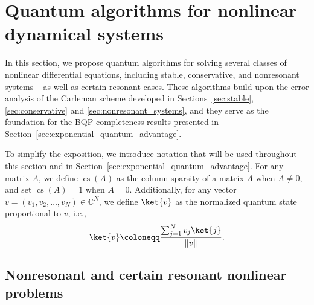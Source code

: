 \documentclass[superscriptaddress,onecolumn,nofootinbib,longbibliography,a4paper,accepted=2026-09-29]{quantumarticle}
\theoremstyle{plain}
\theoremstyle{definition}
\numberwithin{thm}{section}
\numberwithin{assumption}{section}
\numberwithin{lemma}{section}
\numberwithin{prop}{section}
\numberwithin{cor}{section}
\numberwithin{definition}{section}
\numberwithin{rmk}{section}
\numberwithin{equation}{section}
\newcommand{\norm}[1]     {\left\| #1 \right\|}
\newcommand{\defeq}{\coloneqq}
\begin{document}
\newpage 

\section{Quantum algorithms for nonlinear dynamical systems}
\label{sec:quantum_algorithms_nonlinear_systems}

In this section, we propose quantum algorithms for solving several classes of nonlinear differential equations, including stable, conservative, and nonresonant systems -- as well as certain resonant cases. These algorithms build upon the error analysis of the Carleman scheme developed in Sections~\ref{sec:stable}, \ref{sec:conservative} and \ref{sec:nonresonant_systems}, and they serve as the foundation for the BQP-completeness results presented in Section~\ref{sec:exponential_quantum_advantage}.

To simplify the exposition, we introduce notation that will be used throughout this section and in Section~\ref{sec:exponential_quantum_advantage}. For any matrix $A$, we define $\operatorname{cs}(A)$ as the column sparsity of a matrix $A$ when $A \neq 0$, and set $\operatorname{cs}(A)=1$ when $A=0$.  Additionally, for any vector $v=(v_1,v_2,\dots,v_N) \in \mathbb{C}^N$, we define $\ket{v}$ as the normalized quantum state proportional to $v$, i.e.,
\begin{align}
\ket{v} \defeq \frac{\sum_{j=1}^N v_j \ket{j}}{\norm{v}}.    
\end{align}

\subsection{Nonresonant and certain resonant nonlinear problems}
\label{subsec:quantum_algorithm_nonresonant_systems}
\end{document}

